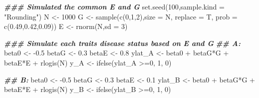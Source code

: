 \documentclass[
]{article}
\newenvironment{Shaded}{\begin{snugshade}}{\end{snugshade}}
\newcommand{\AttributeTok}[1]{\textcolor[rgb]{0.77,0.63,0.00}{#1}}
\newcommand{\DecValTok}[1]{\textcolor[rgb]{0.00,0.00,0.81}{#1}}
\newcommand{\DocumentationTok}[1]{\textcolor[rgb]{0.56,0.35,0.01}{\textbf{\textit{#1}}}}
\newcommand{\FloatTok}[1]{\textcolor[rgb]{0.00,0.00,0.81}{#1}}
\newcommand{\FunctionTok}[1]{\textcolor[rgb]{0.00,0.00,0.00}{#1}}
\newcommand{\NormalTok}[1]{#1}
\newcommand{\OtherTok}[1]{\textcolor[rgb]{0.56,0.35,0.01}{#1}}
\newcommand{\SpecialCharTok}[1]{\textcolor[rgb]{0.00,0.00,0.00}{#1}}
\newcommand{\StringTok}[1]{\textcolor[rgb]{0.31,0.60,0.02}{#1}}
\begin{document}
\begin{Shaded}
\begin{Highlighting}[]
\DocumentationTok{\#\#\# Simulated the common E and G}
\FunctionTok{set.seed}\NormalTok{(}\DecValTok{100}\NormalTok{,}\AttributeTok{sample.kind =} \StringTok{"Rounding"}\NormalTok{)}
\NormalTok{N }\OtherTok{\textless{}{-}} \DecValTok{1000}
\NormalTok{G }\OtherTok{\textless{}{-}} \FunctionTok{sample}\NormalTok{(}\FunctionTok{c}\NormalTok{(}\DecValTok{0}\NormalTok{,}\DecValTok{1}\NormalTok{,}\DecValTok{2}\NormalTok{),}\AttributeTok{size =}\NormalTok{ N, }\AttributeTok{replace =}\NormalTok{ T, }\AttributeTok{prob =} \FunctionTok{c}\NormalTok{(}\FloatTok{0.49}\NormalTok{,}\FloatTok{0.42}\NormalTok{,}\FloatTok{0.09}\NormalTok{))}
\NormalTok{E }\OtherTok{\textless{}{-}} \FunctionTok{rnorm}\NormalTok{(N,}\AttributeTok{sd =} \DecValTok{3}\NormalTok{)}


\DocumentationTok{\#\#\# Simulate each trait\textquotesingle{}s disease status based on E and G}
\DocumentationTok{\#\# A:}
\NormalTok{beta0 }\OtherTok{\textless{}{-}} \SpecialCharTok{{-}}\FloatTok{0.5}
\NormalTok{betaG }\OtherTok{\textless{}{-}} \FloatTok{0.3}
\NormalTok{betaE }\OtherTok{\textless{}{-}} \FloatTok{0.8}
\NormalTok{ylat\_A }\OtherTok{\textless{}{-}}\NormalTok{ beta0 }\SpecialCharTok{+}\NormalTok{ betaG}\SpecialCharTok{*}\NormalTok{G }\SpecialCharTok{+}\NormalTok{ betaE}\SpecialCharTok{*}\NormalTok{E }\SpecialCharTok{+} \FunctionTok{rlogis}\NormalTok{(N)}
\NormalTok{y\_A }\OtherTok{\textless{}{-}} \FunctionTok{ifelse}\NormalTok{(ylat\_A }\SpecialCharTok{\textgreater{}=}\DecValTok{0}\NormalTok{, }\DecValTok{1}\NormalTok{, }\DecValTok{0}\NormalTok{)}

\DocumentationTok{\#\# B:}
\NormalTok{beta0 }\OtherTok{\textless{}{-}} \SpecialCharTok{{-}}\FloatTok{0.5}
\NormalTok{betaG }\OtherTok{\textless{}{-}} \FloatTok{0.3}
\NormalTok{betaE }\OtherTok{\textless{}{-}} \FloatTok{0.1}
\NormalTok{ylat\_B }\OtherTok{\textless{}{-}}\NormalTok{ beta0 }\SpecialCharTok{+}\NormalTok{ betaG}\SpecialCharTok{*}\NormalTok{G }\SpecialCharTok{+}\NormalTok{ betaE}\SpecialCharTok{*}\NormalTok{E }\SpecialCharTok{+} \FunctionTok{rlogis}\NormalTok{(N)}
\NormalTok{y\_B }\OtherTok{\textless{}{-}} \FunctionTok{ifelse}\NormalTok{(ylat\_B }\SpecialCharTok{\textgreater{}=}\DecValTok{0}\NormalTok{, }\DecValTok{1}\NormalTok{, }\DecValTok{0}\NormalTok{)}




\end{Highlighting}
\end{Shaded}
\end{document}
